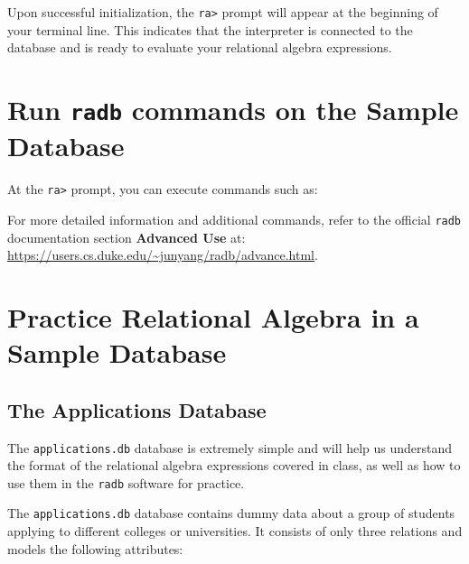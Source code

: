 \documentclass{article}
\begin{document}
Upon successful initialization, the \texttt{ra>} prompt will appear at the beginning of your terminal line. This indicates that the interpreter is connected to the database and is ready to evaluate your relational algebra expressions.

\section{Run \texttt{radb} commands on the Sample Database}

At the \texttt{ra>} prompt, you can execute commands such as:


For more detailed information and additional commands, refer to the official \texttt{radb} documentation section \textbf{Advanced Use} at: \url{https://users.cs.duke.edu/~junyang/radb/advance.html}.

\section{Practice Relational Algebra in a Sample Database}
\subsection{The Applications Database}
The \texttt{applications.db} database is extremely simple and will help us understand the format of the relational algebra expressions covered in class, as well as how to use them in the \texttt{radb} software for practice.

The \texttt{applications.db} database contains dummy data about a group of students applying to different colleges or universities. It consists of only three relations and models the following attributes:
\end{document}
